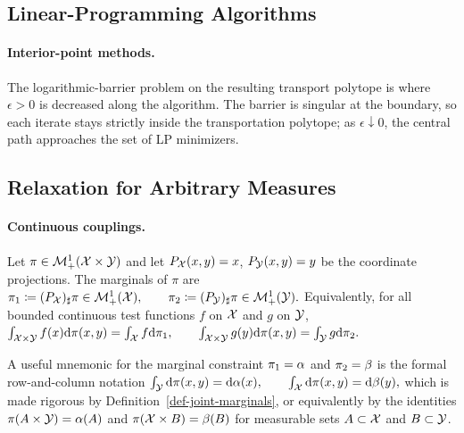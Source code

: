 \subsection{Linear-Programming Algorithms}
\label{sec-kantorovich-lp-algorithms}
\paragraph{Interior-point methods.}
The logarithmic-barrier problem on the resulting transport polytope is
where $\epsilon>0$ is decreased along the algorithm. The barrier is singular at the boundary, so each iterate stays strictly inside the transportation polytope; as $\epsilon\downarrow0$, the central path approaches the set of LP minimizers.

\subsection{Relaxation for Arbitrary Measures}
\label{sec-kantorovich-continuous}
\paragraph{Continuous couplings.}
\begin{defn}\label{def-joint-marginals}
Let $\pi\in\mathcal{M}_+^1(\mathcal{X}\times\mathcal{Y})$ and let $P_{\mathcal{X}}(x,y)=x$, $P_{\mathcal{Y}}(x,y)=y$ be the coordinate projections. The marginals of $\pi$ are
\(\pi_1\coloneqq(P_{\mathcal{X}})_\sharp\pi\in\mathcal{M}_+^1(\mathcal{X}), \qquad \pi_2\coloneqq(P_{\mathcal{Y}})_\sharp\pi\in\mathcal{M}_+^1(\mathcal{Y}).\)
Equivalently, for all bounded continuous test functions $f$ on $\mathcal{X}$ and $g$ on $\mathcal{Y}$, \(\int_{\mathcal{X}\times\mathcal{Y}} f(x)\mathrm{d}\pi(x,y)=\int_{\mathcal{X}} f\mathrm{d}\pi_1, \qquad \int_{\mathcal{X}\times\mathcal{Y}} g(y)\mathrm{d}\pi(x,y)=\int_{\mathcal{Y}} g\mathrm{d}\pi_2.\)
\end{defn}
A useful mnemonic for the marginal constraint $\pi_1=\alpha$ and $\pi_2=\beta$ is the formal row-and-column notation
\(\int_{\mathcal{Y}} \mathrm{d}\pi(x,y)=\mathrm{d}\alpha(x), \qquad \int_{\mathcal{X}} \mathrm{d}\pi(x,y)=\mathrm{d}\beta(y),\)
which is made rigorous by Definition~\ref{def-joint-marginals}, or equivalently by the identities $\pi(A\times\mathcal{Y})=\alpha(A)$ and $\pi(\mathcal{X}\times B)=\beta(B)$ for measurable sets $A\subset\mathcal{X}$ and $B\subset\mathcal{Y}$.

